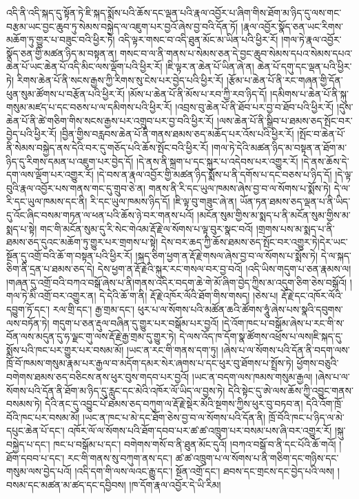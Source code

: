 འདི་ནི་འདི་སྐད་དུ་སྟོན་ཏེ་ཇི་སྐད་སྨོས་པའི་ཆོས་དང་ལྡན་པའི་རྣལ་འབྱོར་པ་ཞིག་གིས་ཐོག་མ་ཉིད་དུ་ལས་གང་བརྩམ་ཡང་བྱང་ཆུབ་ཏུ་སེམས་བསྐྱེད་ལ་འཇུག་པར་བྱའོ་ཞེས་བྱ་བའི་དོན་ཏོ། །རྣལ་འབྱོར་སྣོད་ཅན་ཡང་རིགས་མཆོག་ཏུ་གྱུར་པ་བཟུང་བའི་ཕྱིར་ཏེ། འདི་ལྟར་གསང་བ་འདི་ཐུན་མོང་མ་ཡིན་པའི་ཕྱིར་རོ། །གལ་ཏེ་རྣལ་འབྱོར་སྣོད་ཅན་གྱི་མཚན་ཉིད་མ་བསྟན་ན། གསང་བ་ལ་ནི་གནས་པ་སེམས་ཅན་དེ་བྱང་ཆུབ་སེམས་དཔའ་སེམས་དཔའ་ཆེན་པོ་ཡང་ཆེན་པོ་འདི་མིང་ལས་ལྡོག་པའི་ཕྱིར་རོ། །ཇི་ལྟར་ན་ཆེན་པོ་ཡིན་ཞེ་ན། ཆེན་པོ་དགུ་དང་ལྡན་པའི་ཕྱིར་ཏེ། རིགས་ཆེན་པོ་ནི་སངས་རྒྱས་ཀྱི་རིགས་སུ་ངེས་པར་བྱེད་པའི་ཕྱིར་རོ། །རྩོམ་པ་ཆེན་པོ་ནི་རང་གཞན་གྱི་དོན་ཕུན་སུམ་ཚོགས་པ་བརྩོན་པའི་ཕྱིར་རོ། །མོས་པ་ཆེན་པོ་ནི་མོས་པ་རབ་ཀྱི་རབ་ཉིད་དོ། །དམིགས་པ་ཆེན་པོ་ནི་སྐུ་གསུམ་མཛད་པ་དང་བཅས་པ་ལ་དམིགས་པའི་ཕྱིར་རོ། །འབྲས་བུ་ཆེན་པོ་ནི་ཐོབ་པར་བྱ་བ་ཐོབ་པའི་ཕྱིར་རོ། །དུས་ཆེན་པོ་ནི་ཚེ་གཅིག་གིས་སངས་རྒྱས་པར་འགྲུབ་པར་བྱ་བའི་ཕྱིར་རོ། །ལས་ཆེན་པོ་ནི་སྒྲིབ་པ་ཐམས་ཅད་སྤོང་བར་བྱེད་པའི་ཕྱིར་རོ། །བྱིན་གྱིས་བརླབས་ཆེན་པོ་ནི་གནས་ཐམས་ཅད་མཆོད་པར་འོས་པའི་ཕྱིར་རོ། །སྤོང་བ་ཆེན་པོ་ནི་སེམས་བསྐྱེད་ནས་དེའི་བར་དུ་གཅོད་པའི་ཆོས་སྤོང་བའི་ཕྱིར་རོ། །གལ་ཏེ་དེའི་མཚན་ཉིད་མ་བསྟན་ན་ཐོག་མ་ཉིད་དུ་རིགས་དམན་པ་འཇུག་པར་བྱེད་དོ། །དེ་ནས་ནི་སྐྲག་པ་དང་སྐུར་པ་འདེབས་པར་འགྱུར་རོ། །དེ་ནས་ཆོས་དེ་དག་ལས་ལྡོག་པར་འགྱུར་རོ། །དེ་བས་ན་རྣལ་འབྱོར་གྱི་མཚན་ཉིད་སྨོས་པ་ནི་དགོས་པ་དང་བཅས་པ་ཉིད་དོ། །དེ་ལྟ་བུའི་རྣལ་འབྱོར་པས་གནས་གང་དུ་གྲུབ་ཅེ་ན།  ​ གནས་ནི་རི་དང་ཡུལ་ཁམས་ཞེས་བྱ་བ་ལ་སོགས་པ་སྨོས་ཏེ། དེ་ལ་རི་དང་ཡུལ་ཁམས་དང་ནི། རི་དང་ཡུལ་ཁམས་ཉིད་དོ། །ཇི་ལྟ་བུ་གཟུང་ཞེ་ན། ཡོན་ཏན་ཐམས་ཅད་ལྡན་པ་ནི་ཡིད་དུ་འོང་ཞིང་བསམ་གཏན་ལ་ཕན་པའི་ཆོས་ཉེ་བར་གནས་པའོ། །མངོན་སུམ་གྱིས་མ་སྨད་པ་ནི་མངོན་སུམ་གྱིས་མ་སྨད་པ་སྟེ། གང་གི་མངོན་སུམ་དུ་རི་སེང་གེའམ་རྡོ་རྗེ་ལ་སོགས་པ་ལྟ་བུར་སྣང་བའོ། །གྲགས་པས་མ་སྨད་པ་ནི་ཐམས་ཅད་དུའང་མཆོག་ཏུ་གྱུར་པར་གྲགས་པ་སྟེ། དེས་བར་ཆད་ཀྱི་ཆོས་ཐམས་ཅད་སྤོང་བར་འགྱུར་ཏེ།དེར་ཡང་སྔོན་དུ་འགྲོ་བའི་ཆོ་ག་བསྟན་པའི་ཕྱིར་རོ། །སྐད་ཅིག་ཕྱག་ན་རྡོ་རྗེ་གསལ་ཞེས་བྱ་བ་ལ་སོགས་པ་སྨོས་ཏེ། དེ་ལ་སྐད་ཅིག་ནི་དྲན་པ་ཐམས་ཅད་དེ། དེས་ཕྱག་ན་རྡོ་རྗེའི་སྐུར་རང་གསལ་བར་བྱ་བའོ། །འདི་ཡིས་གདུག་པ་ཅན་རྣམས་ལ། །གཞན་དུ་འགྲོ་བའི་བཀའ་བསྒོ་ཞེས་པ་ནི།གནས་འདིར་བདག་ཆེ་གེ་མོ་ཞིག་བྱེད་ཀྱིས་མ་འདུག་ཅིག་ཅེས་བསྒོའོ། །གལ་ཏེ་མི་འགྲོ་བར་འགྱུར་ན། དེ་དེའི་ཆོ་ག་ནི། རྡོ་རྗེ་འཁོར་ལོའི་ཐོག་གིས་གསད། །ཅེས་པ། རྡོ་རྗེ་དང་འཁོར་ལོའི་དབྱུག་ཏོ་དང་། རལ་གྲི་དང་། རྒྱ་གྲམ་དང་། ཕུར་པ་ལ་སོགས་པའི་མཚོན་ཆའི་ཚོགས་ཧཱུཾ་ཞེས་པས་སྣའི་དབུགས་ལས་བཏོན་ཏེ། གདུག་པ་ཅན་རྡུལ་བཞིན་དུ་གྱུར་པར་བསྒོམ་པར་བྱའོ། །དེ་འོག་ཁང་པ་བསྒོམ་ཞེས་པ་རང་གི་ས་བོན་ལས་མདུན་དུ་ཧ་ལྗང་གུ་ལས་རྡོ་རྗེ་རྒྱ་གྲམ་དུ་གྱུར་ཏེ། དེ་ལས་འོད་ཁ་དོག་སྣ་ཚོགས་འཕྲོས་པ་ལས།ཇི་སྐད་དུ་སྨོས་པའི་ཁང་པར་གྱུར་པར་བསམ་མོ། །ཡང་ན་རང་གི་གནས་དག་ཏུ། །ཞེས་པ་ལ་སོགས་པའི་དོན་ནི་བདག་ལས་ཁྲོ་བོ་ཁམས་གསུམ་རྣམ་པར་རྒྱལ་བ་མདོག་དམར་སེར་ཞགས་པ་དང་ཕུར་བུ་ཐོགས་པ་སྤྲོས་ཏེ། ཕྱོགས་བཅུའི་བགེགས་ཐམས་ཅད་བཅིངས་ནས་ཕུར་བུས་གདབ་པར་བྱའོ། །ཡང་ན་བདག་ལས་ཁམས་གསུམ་རྒྱལ། །ཞེས་པ་ལ་སོགས་པའི་དོན་ནི་ཐོག་མ་ཉིད་དུ་རླུང་དང་མེའི་འཁོར་ལོ་ཡིད་ལ་བྱས་ཏེ། དེའི་སྟེང་དུ་ཨེ་ལས་ཆོས་ཀྱི་འབྱུང་གནས་བསམས་ཏེ། དེའི་ནང་དུ་འབྱུང་པོ་ཐམས་​ ཅད་བཀུག་ལ་རྡོ་རྗེ་སྡེར་མོའི་སྔགས་ཀྱིས་ཕུར་བུ་བཏབ་ན། དེའི་འོག་ཁྲོ་བོའི་ཁང་པར་བསམ་མོ། །ཡང་ན་ཁང་པ་མེ་དང་ཐོག་ཅེས་བྱ་བ་ལ་སོགས་པའི་དོན་ནི། ཁྲོ་བོའི་ཁང་པ་ཉིད་ལ་མེ་དཔུང་ཆེན་པོ་དང་། འཁོར་ལོ་ལ་སོགས་པའི་ཐོག་དབབ་པར་ཚ་ཚ་འཁྲུག་པར་བསམ་པས་ཞི་བར་འགྱུར་རོ། །སྐུ་བསྐྱེད་པ་དང་། ཁང་པ་བསྒོམ་པ་དང་། བགེགས་གསོ་བ་ནི་ཐུན་མོང་དུའོ། །བཀའ་བསྒོ་བ་ནི་དང་པོའི་ཆོ་གའོ། །ཐོག་དབབ་པ་དང་། རང་གི་གནས་སུ་བཀུག་ནས་དང་། ཚ་ཚ་འཁྲུག་པ་ལ་སོགས་པ་ནི་གཅིག་དང་གཉིས་དང་གསུམ་ལས་བྱེད་པའོ། །འདི་དག་གི་ལས་ལའང་རྒྱུ་དང་། སྔོན་འགྲོ་དང་། ཐབས་དང་གྲངས་དང་བྱེད་པའི་ལས། །བསམ་དང་མཚན་མ་ཚད་དང་དབྱིབས། །ཁ་དོག་རྣལ་འབྱོར་དེ་ཡི་རིམ། 
